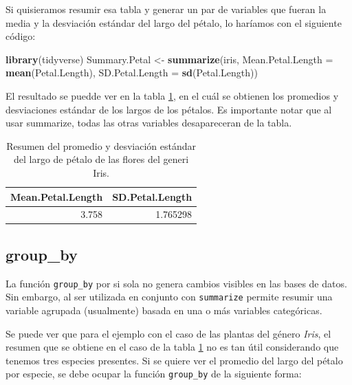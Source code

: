 \documentclass[]{book}
\newenvironment{Shaded}{\begin{snugshade}}{\end{snugshade}}
\newcommand{\DataTypeTok}[1]{\textcolor[rgb]{0.13,0.29,0.53}{#1}}
\newcommand{\KeywordTok}[1]{\textcolor[rgb]{0.13,0.29,0.53}{\textbf{#1}}}
\newcommand{\NormalTok}[1]{#1}
\newcommand{\StringTok}[1]{\textcolor[rgb]{0.31,0.60,0.02}{#1}}
\begin{document}
Si quisieramos resumir esa tabla y generar un par de variables que
fueran la media y la desviación estándar del largo del pétalo, lo
haríamos con el siguiente código:

\begin{Shaded}
\begin{Highlighting}[]
\KeywordTok{library}\NormalTok{(tidyverse)}
\NormalTok{Summary.Petal <-}\StringTok{ }\KeywordTok{summarize}\NormalTok{(iris, }\DataTypeTok{Mean.Petal.Length =} \KeywordTok{mean}\NormalTok{(Petal.Length), }
    \DataTypeTok{SD.Petal.Length =} \KeywordTok{sd}\NormalTok{(Petal.Length))}
\end{Highlighting}
\end{Shaded}

El resultado se puedde ver en la tabla \ref{tab:SummaryPetaltab}, en el
cuál se obtienen los promedios y desviaciones estándar de los largos de
los pétalos. Es importante notar que al usar summarize, todas las otras
variables desapareceran de la tabla.

\begin{table}

\caption{\label{tab:SummaryPetaltab}Resumen del promedio y desviación estándar del largo de pétalo de las flores del generi Iris.}
\centering
\begin{tabular}[t]{rr}
\toprule
Mean.Petal.Length & SD.Petal.Length\\
\midrule
3.758 & 1.765298\\
\bottomrule
\end{tabular}
\end{table}

\hypertarget{group_by}{%
\subsection{group\_by}\label{group_by}}

La función \texttt{group\_by} por si sola no genera cambios visibles en
las bases de datos. Sin embargo, al ser utilizada en conjunto con
\texttt{summarize} permite resumir una variable agrupada (usualmente)
basada en una o más variables categóricas.

Se puede ver que para el ejemplo con el caso de las plantas del género
\emph{Iris}, el resumen que se obtiene en el caso de la tabla
\ref{tab:SummaryPetaltab} no es tan útil considerando que tenemos tres
especies presentes. Si se quiere ver el promedio del largo del pétalo
por especie, se debe ocupar la función \texttt{group\_by} de la
siguiente forma:
\end{document}
